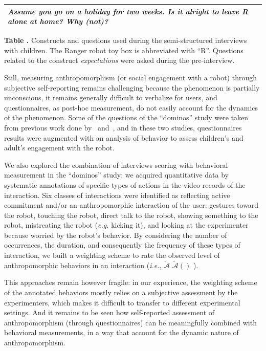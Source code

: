 \documentclass{frontiersSCNS} %
\newcommand{\eg}{\textit{e.g.}\xspace}
\newcommand{\ie}{\textit{i.e.}\xspace}
\newcommand{\AntE}[1][]{%
      \ifthenelse{\isempty{#1}}%
      {$\widetilde{\mathcal{A}}$}
      {$\widetilde{\mathcal{A}}(#1)$}
}
\begin{document}
\begin{table}
\begin{tabular}{lp{10cm}}
    \emph{Assume you go on a holiday for two weeks. Is it alright to leave R
    alone at home? Why (not)?}
    \\
    \bottomrule

    \end{tabular}

    \textbf{\label{tab:domino-questions}Table .} Constructs and questions used during the semi-structured interviews
    with children. The Ranger robot toy box is abbreviated with ``R''. Questions
    related to the construct \emph{expectations} were asked during the
    pre-interview.

\end{table}

Still, measuring anthropomorphism (or social engagement with a robot) through
subjective self-reporting remains challenging because the phenomenon is
partially unconscious, it remains generally difficult to verbalize for users,
and questionnaires, as post-hoc measurement, do not easily account for the
dynamics of the phenomenon.  Some of the questions of the ``dominos'' study were
taken from previous work done by~\cite{kahn_jr._robotic_2006}
and~\cite{weiss_i_2009}, and in these two studies, questionnaires results were
augmented with an analysis of behavior to assess children's and adult's
engagement with the robot.

We also explored the combination of interviews scoring with behavioral
measurement in the ``dominos'' study: we acquired quantitative data by
systematic annotations of specific types of actions in the video records of the
interaction. Six classes of interactions were identified as reflecting active
commitment and/or an anthropomorphic interaction of the user: gestures toward
the robot, touching the robot, direct talk to the robot, showing something to
the robot, mistreating the robot (\eg kicking it), and looking at the
experimenter because worried by the robot's behavior.
By considering the number of occurrences, the duration, and consequently the
frequency of these types of interaction, we built a weighting scheme to rate
the observed level of anthropomorphic behaviors in an interaction (\ie, \AntE).

This approaches remain however fragile: in our experience, the weighting scheme
of the annotated behaviors mostly relies on a subjective assessment by the
experimenters, which makes it difficult to transfer to different experimental
settings. And it remains to be seen how self-reported assessment of
anthropomorphism (through questionnaires) can be meaningfully combined with
behavioral measurements, in a way that account for the dynamic nature of
anthropomorphism.
\end{document}

